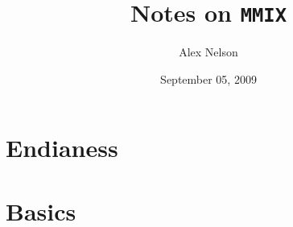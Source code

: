 \documentclass{article}
\title{Notes on {\tt MMIX}}
\date{September 05, 2009}
\author{Alex Nelson}
\begin{document}
\maketitle

\section{Endianess}


\section{Basics}


\nocite{*}


\end{document}
